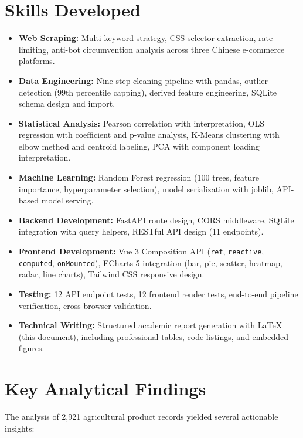 \documentclass[12pt,a4paper]{report}
\begin{document}
\section{Skills Developed}

\begin{itemize}[itemsep=2pt]
  \item \textbf{Web Scraping:} Multi-keyword strategy, CSS selector extraction, rate limiting, anti-bot circumvention analysis across three Chinese e-commerce platforms.
  \item \textbf{Data Engineering:} Nine-step cleaning pipeline with pandas, outlier detection (99th percentile capping), derived feature engineering, SQLite schema design and import.
  \item \textbf{Statistical Analysis:} Pearson correlation with interpretation, OLS regression with coefficient and p-value analysis, K-Means clustering with elbow method and centroid labeling, PCA with component loading interpretation.
  \item \textbf{Machine Learning:} Random Forest regression (100 trees, feature importance, hyperparameter selection), model serialization with joblib, API-based model serving.
  \item \textbf{Backend Development:} FastAPI route design, CORS middleware, SQLite integration with query helpers, RESTful API design (11 endpoints).
  \item \textbf{Frontend Development:} Vue 3 Composition API (\texttt{ref}, \texttt{reactive}, \texttt{computed}, \texttt{onMounted}), ECharts 5 integration (bar, pie, scatter, heatmap, radar, line charts), Tailwind CSS responsive design.
  \item \textbf{Testing:} 12 API endpoint tests, 12 frontend render tests, end-to-end pipeline verification, cross-browser validation.
  \item \textbf{Technical Writing:} Structured academic report generation with LaTeX (this document), including professional tables, code listings, and embedded figures.
\end{itemize}

\section{Key Analytical Findings}

The analysis of 2,921 agricultural product records yielded several actionable insights:
\end{document}
